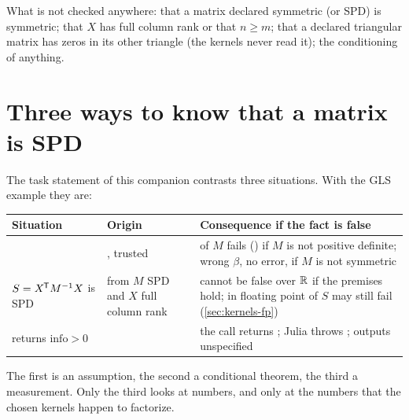 What is not checked anywhere: that a matrix declared symmetric (or SPD) is
symmetric; that \(X\) has full column rank or that \(n\ge m\); that a
declared triangular matrix has zeros in its other triangle (the kernels
never read it); the conditioning of anything.

\section{Three ways to know that a matrix is SPD}
\label{sec:facts-three}

The task statement of this companion contrasts three situations. With the
GLS example they are:

\begin{center}\small
\begin{tabularx}{\linewidth}{@{}P{3.2cm}P{3.6cm}L@{}}
\toprule
\textbf{Situation} & \textbf{Origin} & \textbf{Consequence if the fact is false} \\
\midrule
{} & \Odecl{}, trusted &  of \(M\) fails () if \(M\) is not positive definite; wrong \(\beta\), no error, if \(M\) is not symmetric \\
\(S = X^{\mkern-1.5mu\mathsf{T}} M^{-1} X\) is SPD & \Oinf{} from \(M\) SPD and \(X\) full column rank & cannot be false over \(\mathbb{R}\) if the premises hold; in floating point  of \(S\) may still fail (\cref{sec:kernels-fp}) \\
 returns \(\mathrm{info}>0\) & \Orun{} & the call returns ; Julia throws ; outputs unspecified \\
\bottomrule
\end{tabularx}
\end{center}

The first is an assumption, the second a conditional theorem, the third a
measurement. Only the third looks at numbers, and only at the numbers that
the chosen kernels happen to factorize.
